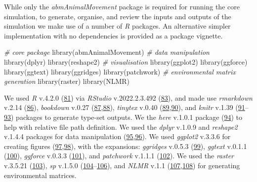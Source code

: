 \documentclass[10pt,a4paper]{article}
\newenvironment{Shaded}{}{}
\newcommand{\CommentTok}[1]{\textit{#1}}
\newcommand{\FunctionTok}[1]{#1}
\newcommand{\NormalTok}[1]{#1}
\begin{document}
While only the \emph{abmAnimalMovement} package is required for running the core simulation, to generate, organise, and review the inputs and outputs of the simulation we make use of a number of \emph{R} packages.
An alternative simpler implementation with no dependencies is provided as a package vignette.

\begin{Shaded}
\begin{Highlighting}[]
\CommentTok{\# core package}
\FunctionTok{library}\NormalTok{(abmAnimalMovement)}
\CommentTok{\# data manipulation}
\FunctionTok{library}\NormalTok{(dplyr)}
\FunctionTok{library}\NormalTok{(reshape2)}
\CommentTok{\# visualisation}
\FunctionTok{library}\NormalTok{(ggplot2)}
\FunctionTok{library}\NormalTok{(ggforce)}
\FunctionTok{library}\NormalTok{(ggtext)}
\FunctionTok{library}\NormalTok{(ggridges)}
\FunctionTok{library}\NormalTok{(patchwork)}
\CommentTok{\# environmental matrix generation}
\FunctionTok{library}\NormalTok{(raster)}
\FunctionTok{library}\NormalTok{(NLMR)}
\end{Highlighting}
\end{Shaded}

We used \emph{R} v.4.2.0 (\protect\hyperlink{ref-R-base}{81}) via \emph{RStudio} v.2022.2.3.492 (\protect\hyperlink{ref-RStudioTeam2021}{83}), and made use \emph{rmarkdown} v.2.14 (\protect\hyperlink{ref-rmarkdown2020}{86}), \emph{bookdown} v.0.27 (\protect\hyperlink{ref-bookdown2016}{87},\protect\hyperlink{ref-R-bookdown}{88}), \emph{tinytex} v.0.40 (\protect\hyperlink{ref-tinytex2019}{89},\protect\hyperlink{ref-R-tinytex}{90}), and \emph{knitr} v.1.39 (\protect\hyperlink{ref-knitr2015}{91}--\protect\hyperlink{ref-R-knitr}{93}) packages to generate type-set outputs.
We the \emph{here} v.1.0.1 package (\protect\hyperlink{ref-R-here}{94}) to help with relative file path definition.
We used the \emph{dplyr} v.1.0.9 and \emph{reshape2} v.1.4.4 packages for data manipulation (\protect\hyperlink{ref-R-dplyr}{95},\protect\hyperlink{ref-reshape22007}{96}).
We used \emph{ggplot2} v.3.3.6 for creating figures (\protect\hyperlink{ref-R-ggplot2}{97},\protect\hyperlink{ref-ggplot22016}{98}), with the expansions: \emph{ggridges} v.0.5.3 (\protect\hyperlink{ref-R-ggridges}{99}), \emph{ggtext} v.0.1.1 (\protect\hyperlink{ref-R-ggtext}{100}), \emph{ggforce} v.0.3.3 (\protect\hyperlink{ref-R-ggforce}{101}), and \emph{patchwork} v.1.1.1 (\protect\hyperlink{ref-R-patchwork}{102}).
We used the \emph{raster} v.3.5.21 (\protect\hyperlink{ref-R-raster}{103}), \emph{sp} v.1.5.0 (\protect\hyperlink{ref-sp2013}{104}--\protect\hyperlink{ref-R-sp}{106}), and \emph{NLMR} v.1.1 (\protect\hyperlink{ref-NLMR2018}{107},\protect\hyperlink{ref-R-NLMR}{108}) for generating environmental matrices.
\end{document}
